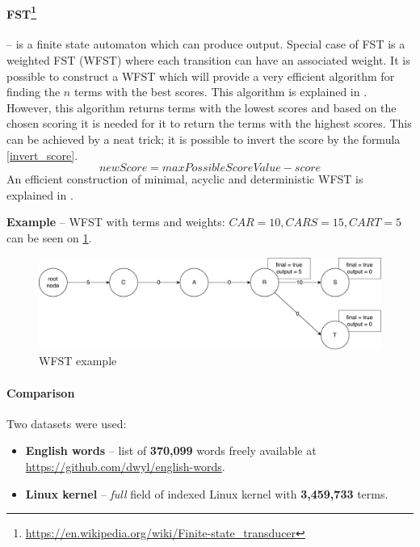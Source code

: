\paragraph{FST\protect\footnote{\url{https://en.wikipedia.org/wiki/Finite-state\_transducer}}} \label{FST} – is a finite state
automaton which can produce output. Special case of FST is a weighted FST (WFST) where each transition can have an
associated weight. It is possible to construct a WFST which will provide a very efficient algorithm for finding the
$n$ terms with the best scores. This algorithm is explained in \citep{Mohri02anefficient}. However, this algorithm returns
terms with the lowest scores and based on the chosen scoring it is needed for it to return the terms with the highest
scores. This can be achieved by a neat trick; it is possible to invert the score by the formula \ref{invert_score}.
\begin{equation}
\label{invert_score}
newScore = maxPossibleScoreValue - score
\end{equation}
An efficient construction of minimal, acyclic and deterministic WFST is explained in \citep{Mihov01directconstruction}.

\textbf{Example} – WFST with terms and weights: $CAR = 10, CARS = 15, CART = 5$ can be seen on \ref{wfst_example}.

\begin{figure}[htbp]
\centering
\includegraphics[width=145mm]{../img/wfst.pdf}
\caption{WFST example}
\label{wfst_example}
\end{figure}


\paragraph{Comparison}

Two datasets were used:
\begin{itemize}
    \item \textbf{English words} – list of \textbf{370,099} words freely available at \url{https://github.com/dwyl/english-words}.
    \item \textbf{Linux kernel} – \textit{full} field of indexed Linux kernel with \textbf{3,459,733} terms.
\end{itemize}

